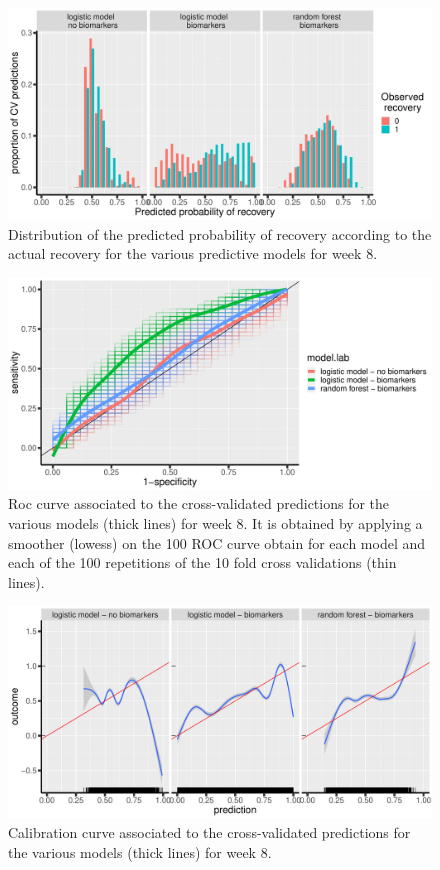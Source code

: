 \documentclass[12pt]{article}
\begin{document}
\begin{figure}[!h]
\centering
\includegraphics[trim={0 0 0 0},width=1\textwidth]{./figures/gg-perfW8-hist2.pdf}
\caption{\label{fig:predW8}Distribution of the predicted probability of recovery according to the actual recovery for the various predictive models for week 8.}
\end{figure}

\begin{figure}[!h]
\centering
\includegraphics[trim={0 0 0 0},width=1\textwidth]{./figures/gg-perfW8-roc.pdf}
\caption{\label{fig:rocW8}Roc curve associated to the cross-validated predictions for the various models (thick lines) for week 8. It is obtained by applying a smoother (lowess) on the 100 ROC curve obtain for each model and each of the 100 repetitions of the 10 fold cross validations (thin lines).}
\end{figure}

\clearpage

\begin{figure}[!h]
\centering
\includegraphics[trim={0 0 0 0},width=1\textwidth]{./figures/gg-perfW8-cali.pdf}
\caption{\label{fig:caliW8}Calibration curve associated to the cross-validated predictions for the various models (thick lines) for week 8.}
\end{figure}
\end{document}

